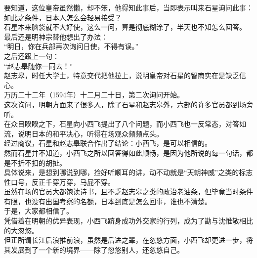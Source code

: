 \begin{multicols}{\theparacolNo}
要知道，这位皇帝虽然懒，却不笨，他得知此事后，当即表示叫来石星询问此事：如此之条件，日本人怎么会轻易接受？\\

石星本来脑袋就不大好使，这么一问，算是彻底糊涂了，半天也不知怎么回答。\\

最后还是明神宗替他想出了办法：\\

“明日，你在兵部再次询问日使，不得有误。”\\

之后还跟上一句：\\

“赵志皋随你一同去！”\\

赵志皋，时任大学士，特意交代把他拉上，说明皇帝对石星的智商实在是缺乏信心。\\

万历二十二年（1594年）十二月二十日，第二次询问开始。\\

这次询问，明朝方面来了很多人，除了石星和赵志皋外，六部的许多官员都到场旁听。\\

在众目睽睽之下，石星向小西飞提出了八个问题，而小西飞也一反常态，对答如流，说明日本的和平决心，听得在场观众频频点头。\\

经过商议，石星和赵志皋联合作出了结论：小西飞，是可以相信的。\\

然而石星并不知道，小西飞之所以回答得如此顺畅，是因为他所说的每一句话，都是不折不扣的胡扯。\\

具体说来，是想到哪说到哪，捡好听顺耳的讲，动不动就是“天朝神威”之类的标志性口号，反正千穿万穿，马屁不穿。\\

虽然在场的官员大都饱读诗书，且不乏赵志皋之类的政治老油条，但毕竟当时条件有限，也没有出国考察的名额，日本到底是怎么回事，谁也不清楚。\\

于是，大家都相信了。\\

凭借着在明朝的优异表现，小西飞跻身成功外交家的行列，成为了勘与沈惟敬相比的大忽悠。\\

但正所谓长江后浪推前浪，虽然是后进之辈，在忽悠方面，小西飞却更进一步，将其发展到了一个新的境界——除了忽悠别人，还忽悠自己。\\


\end{multicols}
